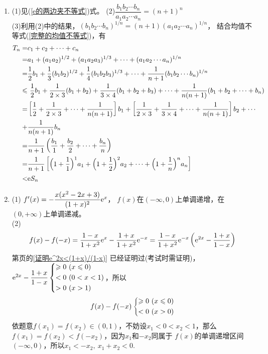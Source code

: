 \begin{enumerate}[label={\textbf{\thechapter.\arabic*}},leftmargin=
    \inteval{\myenumleftmargin}pt]
\item 
(1)见(\ref{e的两边夹不等式})式。 \quad (2)$ \dfrac{b_1b_2\cdots b_n}{a_1a_2\cdots a_n}=(n+1)^n $  \\
(3)利用(2)中的结果，$ (b_1b_2\cdots b_n)^{1/n}=(n+1)(a_1a_2\cdots a_n)^{1/n} $，
结合均值不等式(\ref{完整的均值不等式})，有
\begin{align*}
    T_n=&c_1+c_2+\cdots +c_n \\
    =&a_1+(a_1a_2)^{1/2}+(a_1a_2a_3)^{1/3}+\cdots + (a_1a_2\cdots a_n)^{1/n}\\
    =&\dfrac{1}{2}b_1+\dfrac{1}{3}(b_1b_2)^{1/2}+\dfrac{1}{4}(b_1b_2b_3)^{1/3}+
    \cdots+\dfrac{1}{n+1}(b_1b_2\cdots b_n)^{1/n} \\
    \leq &\ \dfrac{1}{2}b_1+\dfrac{1}{2\times 3}(b_1+b_2)+\dfrac{1}{3\times 4}(b_1+
    b_2+b_3)+\cdots +\dfrac{1}{n(n+1)}(b_1+b_2+\cdots +b_n) \\
    =&\left[\dfrac{1}{2}+\dfrac{1}{2\times 3}+\cdots+\dfrac{1}{n(n+1)}\right]b_1+
    \left[\dfrac{1}{2\times 3}+\dfrac{1}{3\times 4}+\cdots+\dfrac{1}{n(n+1)}\right]b_2+
    \cdots\\
    +&\dfrac{1}{n(n+1)}b_n \\
    =&\dfrac{1}{n+1}\left(\dfrac{b_1}{1}+\dfrac{b_2}{2}+\cdots+\dfrac{b_n}{n}\right) \\
    =&\dfrac{1}{n+1}\left[\Big(1+\dfrac{1}{1}\Big)^1 a_1+\Big(1+\dfrac{1}{2}\Big)^2 a_2+\cdots+\Big(1+\dfrac{1}{n}\Big)^n a_n \right] \\
    <& \e S_n
\end{align*}

\item (1) $ f'(x)=-\dfrac{x(x^2-2x+3)}{(1+x)^2}\e^x $，
$ f(x) $在$ (-\infty,0) $上单调递增，在$ (0,+\infty) $上单调递减。\\
(2) 
\begin{align*}
    f(x)-f(-x)=\dfrac{1-x}{1+x^2}\e^x-\dfrac{1+x}{1+x^2}\e^{-x}=
    \dfrac{1-x}{1+x^2}\e^{-x}\left(\e^{2x}-\dfrac{1+x}{1-x}\right)
\end{align*}
第\pageref{证明e^2x<(1+x)/(1-x)}页的\ref{证明e^2x<(1+x)/(1-x)}
已经证明过(考试时需证明)，$ \e^{2x}-\dfrac{1+x}{1-x}
\begin{dcases}
    \geq 0\ (x\leq 0) \\
    < 0\ (0<x<1) \\
    > 0\ (x>1)
\end{dcases}$，所以
\begin{gather*}
    f(x)-f(-x) \begin{dcases}
        \geq 0\ (x\leq 0) \\
        <0 \ (x>0) 
    \end{dcases}
\end{gather*}
依题意$ f(x_1)=f(x_2)\in (0,1) $，不妨设$ x_1<0<x_2<1 $，那么
$ f(x_1)=f(x_2)<f(-x_2) $，因为$ x_1 $和$ -x_2 $同属于
$ f(x) $的单调递增区间$ (-\infty,0) $，所以$ x_1<-x_2,\ x_1+x_2<0 $.


\end{enumerate}
